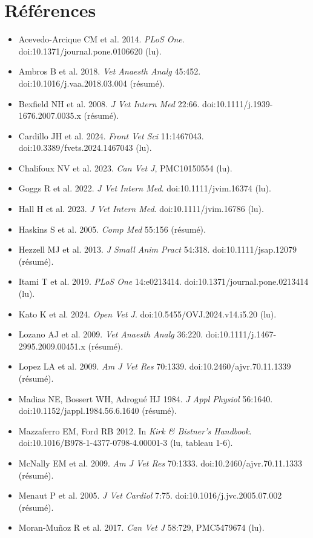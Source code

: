 \documentclass[10pt,a4paper]{article}
\begin{document}
\section*{Références}
\small
\begin{itemize}\setlength\itemsep{0pt}
\item Acevedo-Arcique CM et al. 2014. \emph{PLoS One}. doi:10.1371/journal.pone.0106620 (lu).
\item Ambros B et al. 2018. \emph{Vet Anaesth Analg} 45:452. doi:10.1016/j.vaa.2018.03.004 (résumé).
\item Bexfield NH et al. 2008. \emph{J Vet Intern Med} 22:66. doi:10.1111/j.1939-1676.2007.0035.x (résumé).
\item Cardillo JH et al. 2024. \emph{Front Vet Sci} 11:1467043. doi:10.3389/fvets.2024.1467043 (lu).
\item Chalifoux NV et al. 2023. \emph{Can Vet J}, PMC10150554 (lu).
\item Goggs R et al. 2022. \emph{J Vet Intern Med}. doi:10.1111/jvim.16374 (lu).
\item Hall H et al. 2023. \emph{J Vet Intern Med}. doi:10.1111/jvim.16786 (lu).
\item Haskins S et al. 2005. \emph{Comp Med} 55:156 (résumé).
\item Hezzell MJ et al. 2013. \emph{J Small Anim Pract} 54:318. doi:10.1111/jsap.12079 (résumé).
\item Itami T et al. 2019. \emph{PLoS One} 14:e0213414. doi:10.1371/journal.pone.0213414 (lu).
\item Kato K et al. 2024. \emph{Open Vet J}. doi:10.5455/OVJ.2024.v14.i5.20 (lu).
\item Lozano AJ et al. 2009. \emph{Vet Anaesth Analg} 36:220. doi:10.1111/j.1467-2995.2009.00451.x (résumé).
\item Lopez LA et al. 2009. \emph{Am J Vet Res} 70:1339. doi:10.2460/ajvr.70.11.1339 (résumé).
\item Madias NE, Bossert WH, Adrogué HJ 1984. \emph{J Appl Physiol} 56:1640. doi:10.1152/jappl.1984.56.6.1640 (résumé).
\item Mazzaferro EM, Ford RB 2012. In \emph{Kirk \& Bistner's Handbook}. doi:10.1016/B978-1-4377-0798-4.00001-3 (lu, tableau 1-6).
\item McNally EM et al. 2009. \emph{Am J Vet Res} 70:1333. doi:10.2460/ajvr.70.11.1333 (résumé).
\item Menaut P et al. 2005. \emph{J Vet Cardiol} 7:75. doi:10.1016/j.jvc.2005.07.002 (résumé).
\item Moran-Muñoz R et al. 2017. \emph{Can Vet J} 58:729, PMC5479674 (lu).

\end{itemize}
\end{document}
